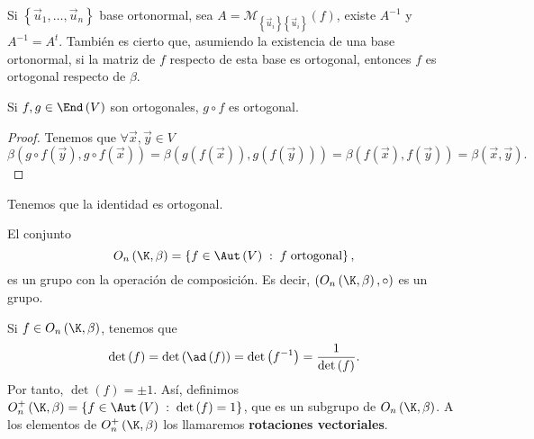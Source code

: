 \begin{observation}
\normalfont 	Si $\displaystyle \left\{ \vec{u}_{1}, \ldots, \vec{u}_{n}\right\}  $ base ortonormal, sea $\displaystyle A = \mathcal{M}_{ \left\{ \vec{u}_{i}\right\} \left\{ \vec{u}_{i}\right\} }\left(f\right) $, existe $\displaystyle A^{-1} $ y $\displaystyle A^{-1} = A^{t} $. También es cierto que, asumiendo la existencia de una base ortonormal, si la matriz de $\displaystyle f $ respecto de esta base es ortogonal, entonces $\displaystyle f $ es ortogonal respecto de $\displaystyle \beta  $.
\end{observation}
\begin{fprop}[]
\normalfont Si $\displaystyle f,g \in \End\left(V\right) $ son ortogonales, $\displaystyle g\circ f $ es ortogonal.
\end{fprop}
\begin{proof}
Tenemos que $\displaystyle \forall \vec{x}, \vec{y} \in V $ 
\[  \beta\left(g\circ f\left(\vec{y}\right), g\circ f\left(\vec{x}\right)\right) = \beta\left(g\left(f\left(\vec{x}\right)\right), g\left(f\left(\vec{y}\right)\right)\right) = \beta\left(f\left(\vec{x}\right), f\left(\vec{y}\right)\right) = \beta\left(\vec{x}, \vec{y}\right).\]
\end{proof}
\begin{eg}
\normalfont Tenemos que la identidad es ortogonal.
\end{eg}
\begin{observation}
\normalfont El conjunto
\[O_{n}\left(\K,\beta \right)= \left\{ f \in \Aut\left(V\right) \; : \; f \; \text{ortogonal}\right\}  ,\]
es un grupo con la operación de composición. Es decir, $\displaystyle \left(O_{n}\left(\K, \beta \right), \circ \right) $ es un grupo.
\end{observation}
Si $\displaystyle f \in O_{n}\left(\K, \beta \right) $, tenemos que 
\[ \det\left(f\right) = \det\left(\ad\left(f\right)\right) = \det\left(f^{-1}\right) = \frac{1}{\det\left(f\right)} .\]
Por tanto, $\displaystyle \det\left(f\right) = \pm1 $. Así, definimos $\displaystyle O_{n}^{+}\left(\K, \beta \right) = \left\{ f \in \Aut\left(V\right) \; : \; \det\left(f\right)=1\right\}  $, que es un subgrupo de $\displaystyle O_{n}\left(\K, \beta \right) $. A los elementos de $\displaystyle O^{+}_{n}\left(\K, \beta \right) $ los llamaremos \textbf{rotaciones vectoriales}. 
